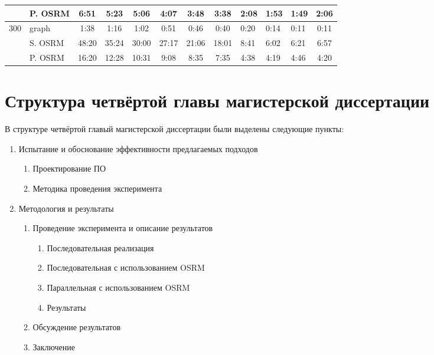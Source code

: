 \documentclass[a4paper, 14pt]{extreport}
\begin{document}
\begin{table}[ht!]
\begin{tabular}{|c|l|c|c|c|c|c|c|l|l|l|c|}
            & P. OSRM  & 6:51  & 5:23  & 5:06  & 4:07  & 3:48  & 3:38  & 2:08                    & 1:53                    & 1:49                    & 2:06 \\ \hline
            \multirow{3}{*}{300}        & graph    & 1:38  & 1:16  & 1:02  & 0:51  & 0:46  & 0:40  & 0:20                    & 0:14                    & 0:11                    & 0:11 \\ \cline{2-12} 
            & S. OSRM  & 48:20 & 35:24 & 30:00 & 27:17 & 21:06 & 18:01 & 8:41                    & 6:02                    & 6:21                    & 6:57 \\ \cline{2-12} 
            & P. OSRM  & 16:20 & 12:28 & 10:31 & 9:08  & 8:35  & 7:35  & 4:38                    & 4:19                    & 4:46                    & 4:20 \\ \hline
        \end{tabular}
    \end{table}

    \chapter{Структура четвёртой главы магистерской диссертации}
    В структуре четвёртой главый магистерской диссертации были выделены следующие пункты:
    \begin{enumerate}
        \item Испытание и обоснование эффективности предлагаемых подходов
        \begin{enumerate}
            \item Проектирование ПО
            \item Методика проведения эксперимента
        \end{enumerate}
        \item Методология и результаты
        \begin{enumerate}
            \item Проведение эксперимента и описание результатов
            \begin{enumerate}
                \item Последовательная реализация
                \item Последовательная с использованием OSRM
                \item Параллельная с использованием OSRM
                \item Результаты
            \end{enumerate}
            \item Обсуждение результатов
            \item Заключение
        \end{enumerate}
    \end{enumerate}
\end{document}
